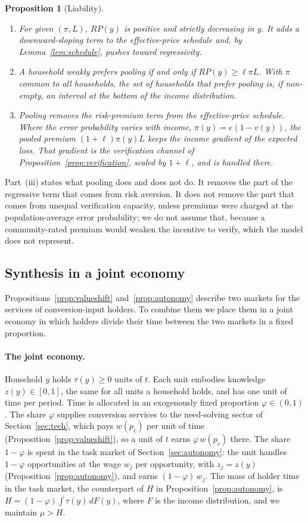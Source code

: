 \documentclass[12pt]{article}
\newtheorem{proposition}{Proposition}
\theoremstyle{remark}
\begin{document}
\begin{proposition}[Liability]\label{prop:liability}
\begin{enumerate}[label=(\roman*),itemsep=0pt]
\item For given $(\pi,L)$, $RP(y)$ is positive and strictly decreasing in $y$. It adds a downward-sloping term to the effective-price schedule and, by Lemma~\ref{lem:schedule}, pushes toward regressivity.
\item A household weakly prefers pooling if and only if $RP(y)\ge\ell\pi L$. With $\pi$ common to all households, the set of households that prefer pooling is, if non-empty, an interval at the bottom of the income distribution.
\item Pooling removes the risk-premium term from the effective-price schedule. Where the error probability varies with income, $\pi(y)=e(1-v(y))$, the pooled premium $(1+\ell)\pi(y)L$ keeps the income gradient of the expected loss. That gradient is the verification channel of Proposition~\ref{prop:verification}, scaled by $1+\ell$, and is handled there.
\end{enumerate}
\end{proposition}

Part~(iii) states what pooling does and does not do. It removes the part of the regressive term that comes from risk aversion. It does not remove the part that comes from unequal verification capacity, unless premiums were charged at the population-average error probability; we do not assume that, because a community-rated premium would weaken the incentive to verify, which the model does not represent.

\subsection{Synthesis in a joint economy}\label{sec:synthesis}

Propositions~\ref{prop:valueshift} and~\ref{prop:autonomy} describe two markets for the services of conversion-input holders. To combine them we place them in a joint economy in which holders divide their time between the two markets in a fixed proportion.

\paragraph{The joint economy.} Household $y$ holds $\tau(y)\ge0$ units of $t$. Each unit embodies knowledge $z(y)\in[0,1]$, the same for all units a household holds, and has one unit of time per period. Time is allocated in an exogenously fixed proportion $\varphi\in(0,1)$. The share $\varphi$ supplies conversion services to the need-solving sector of Section~\ref{sec:tech}, which pays $w(p_c)$ per unit of time (Proposition~\ref{prop:valueshift}), so a unit of $t$ earns $\varphi\,w(p_c)$ there. The share $1-\varphi$ is spent in the task market of Section~\ref{sec:autonomy}: the unit handles $1-\varphi$ opportunities at the wage $w_j$ per opportunity, with $z_j=z(y)$ (Proposition~\ref{prop:autonomy}), and earns $(1-\varphi)\,w_j$. The mass of holder time in the task market, the counterpart of $H$ in Proposition~\ref{prop:autonomy}, is $H=(1-\varphi)\int\tau(y)\,dF(y)$, where $F$ is the income distribution, and we maintain $\mu>H$.
\end{document}
